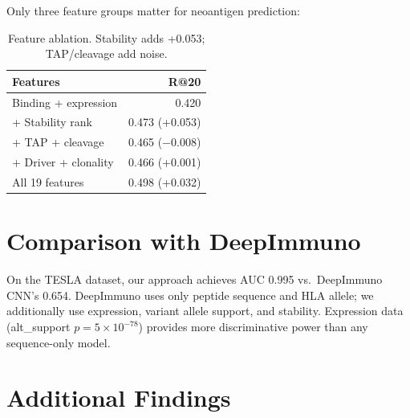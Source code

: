 \documentclass[11pt,twocolumn]{article}
\begin{document}
Only three feature groups matter for neoantigen prediction:

\begin{table}[h]
\centering
\small
\begin{tabular}{lr}
\toprule
\textbf{Features} & \textbf{R@20} \\
\midrule
Binding + expression & 0.420 \\
+ Stability rank & 0.473 (+0.053) \\
+ TAP + cleavage & 0.465 ($-$0.008) \\
+ Driver + clonality & 0.466 (+0.001) \\
All 19 features & 0.498 (+0.032) \\
\bottomrule
\end{tabular}
\caption{Feature ablation. Stability adds +0.053; TAP/cleavage add noise.}
\end{table}

\section{Comparison with DeepImmuno}

On the TESLA dataset, our approach achieves AUC 0.995 vs.\ DeepImmuno
CNN's 0.654. DeepImmuno uses only peptide sequence and HLA allele;
we additionally use expression, variant allele support, and stability.
Expression data (alt\_support $p = 5 \times 10^{-78}$) provides more
discriminative power than any sequence-only model.

\section{Additional Findings}
\end{document}
